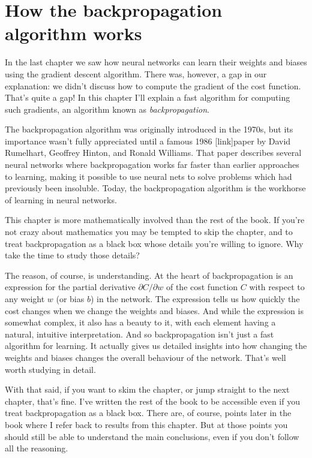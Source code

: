 \documentclass[a4paper,twoside,10pt]{book}
\begin{document}
\chapter{How the backpropagation algorithm works}
In the last chapter we saw how neural networks can learn their weights and biases using the gradient descent algorithm. There was, however, a gap in our explanation: we didn't discuss how to compute the gradient of the cost function. That's quite a gap! In this chapter I'll explain a fast algorithm for computing such gradients, an algorithm known as\textit{ backpropagation}.

The backpropagation algorithm was originally introduced in the 1970s, but its importance wasn't fully appreciated until a famous 1986 [link]paper by David Rumelhart, Geoffrey Hinton, and Ronald Williams. That paper describes several neural networks where backpropagation works far faster than earlier approaches to learning, making it possible to use neural nets to solve problems which had previously been insoluble. Today, the backpropagation algorithm is the workhorse of learning in neural networks.

This chapter is more mathematically involved than the rest of the book. If you're not crazy about mathematics you may be tempted to skip the chapter, and to treat backpropagation as a black box whose details you're willing to ignore. Why take the time to study those details?

The reason, of course, is understanding. At the heart of backpropagation is an expression for the partial derivative $\partial{}C/\partial{}w$ of the cost function $C$ with respect to any weight $w$ (or bias $b$) in the network. The expression tells us how quickly the cost changes when we change the weights and biases. And while the expression is somewhat complex, it also has a beauty to it, with each element having a natural, intuitive interpretation. And so backpropagation isn't just a fast algorithm for learning. It actually gives us detailed insights into how changing the weights and biases changes the overall behaviour of the network. That's well worth studying in detail.

With that said, if you want to skim the chapter, or jump straight to the next chapter, that's fine. I've written the rest of the book to be accessible even if you treat backpropagation as a black box. There are, of course, points later in the book where I refer back to results from this chapter. But at those points you should still be able to understand the main conclusions, even if you don't follow all the reasoning.
\end{document}
